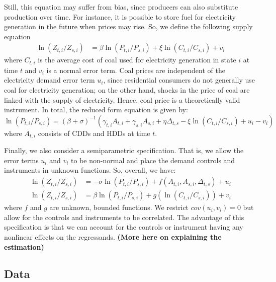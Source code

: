 \documentclass[11pt,a4paper]{extarticle}
\begin{document}
Still, this equation may suffer from bias, since producers can also substitute production over time. For instance, it is possible to store fuel for electricity generation in the future when prices may rise. So, we define the following supply equation
\begin{align*}
\ln (Z_{ t, i} / Z_{ s, i}) &= \beta \ln (P_{t,i} / P_{s,i}) + \xi \ln (C_{t,i} / C_{s,i}) + v_{i}
\end{align*}
where $C_{t,i}$ is the average cost of coal used for electricity generation in state $i$ at time $t$ and $v_i$ is a normal error term. Coal prices are independent of the electricity demand error term $u_i$, since residential consumers do not generally use coal for electricity generation; on the other hand, shocks in the price of coal are linked with the supply of electricity. Hence, coal price is a theoretically valid instrument.  In total, the reduced form equation is given by:
$$ \ln (P_{t,i} / P_{s,i}) = \left( \beta + \sigma \right)^{-1} \left( \gamma_{t,i} A_{t,i} + \gamma_{s,i} A_{s,i} + \eta \Delta_{t,s} - \xi \ln (C_{t,i} / C_{s,i}) + u_{i} - v_i \right)  $$
where $A_{t,i}$ consists of CDDs and HDDs at time $t$. 

Finally, we also consider a semiparametric specification. That is, we allow the error terms $u_i$ and $v_i$ to be non-normal and place the demand controls and instruments in unknown functions. So, overall, we have:
\begin{align*}
\ln (Z_{ t, i} / Z_{ s, i}) &= -\sigma \ln (P_{t,i} / P_{s,i}) +  f \left( A_{t,i}, A_{s,i}, \Delta_{t,s} \right) + u_i \\
\ln (Z_{ t, i} / Z_{ s, i}) &= \beta \ln (P_{t,i} / P_{s,i}) + g \left( \ln (C_{t,i} / C_{s,i})  \right) + v_{i}
\end{align*}
where $f$ and $g$ are unknown, bounded functions. We restrict $cov(u_i, v_i) = 0$ but allow for the controls and instruments to be correlated. The advantage of this specification is that we can account for the controls or instrument having any nonlinear effects on the regressands. \textbf{(More here on explaining the estimation)}

\subsection{Data}
\end{document}
